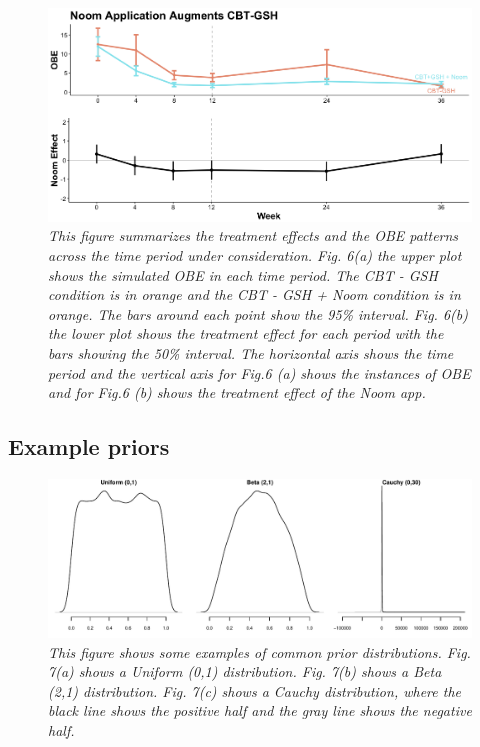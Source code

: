 \documentclass{article}
\begin{document}
\begin{figure}[H]
\begin{center}
\includegraphics[width=\textwidth, height=\textheight, keepaspectratio]{noom_effect.png}
\caption{\emph{This figure summarizes the treatment effects and the OBE patterns across the time period under consideration. Fig. 6(a) the upper plot shows the simulated OBE in each time period. The CBT - GSH condition is in orange and the CBT - GSH + Noom condition is in orange. The bars around each point show the 95\% interval. Fig. 6(b) the lower plot shows the treatment effect for each period with the bars showing the 50\% interval. The horizontal axis shows the time period and the vertical axis for Fig.6 (a) shows the instances of OBE and for Fig.6 (b) shows the treatment effect of the Noom app.}}
\end{center}
\end{figure}

\subsection*{Example priors}
\begin{figure}[H]
\centering
\includegraphics[width=\textwidth, height=\textheight, keepaspectratio]{prior_plot.pdf}
\caption{\emph{This figure shows some examples of common prior distributions. Fig. 7(a) shows a Uniform (0,1) distribution. Fig. 7(b) shows a Beta (2,1) distribution. Fig. 7(c) shows a Cauchy distribution, where the black line shows the positive half and the gray line shows the negative half.}}
\end{figure}
\end{document}
